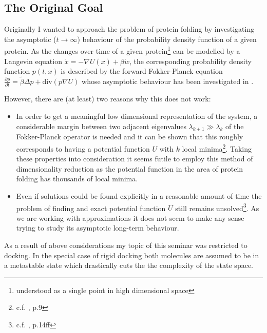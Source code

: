 \subsection{The Original Goal}
Originally I wanted to approach the problem of protein folding by investigating the asymptotic ($t\rightarrow\infty$) behaviour of the probability density function of a given protein. As the changes over time of a given protein\footnote{understood as a single point in high dimensional space} can be modelled by a Langevin equation $\dot x = -\nabla U(x)+\beta\dot w$, the corresponding probability density function $p(t,x)$ is described by the forward Fokker-Planck equation $\frac{\partial p}{\partial t} = \tilde\beta \Delta p + \text{div}(p\nabla U)$ whose asymptotic behaviour has been investigated in \cite{Nadler2008}.

However, there are (at least) two reasons why this does not work:
\begin{itemize}
	\item In order to get a meaningful low dimensional representation of the system, a considerable margin between two adjacent eigenvalues $\lambda_{k+1} \gg \lambda_k$ of the Fokker-Planck operator is needed and it can be shown that this roughly corresponds to having a potential function $U$ with $k$ local minima\footnote{c.f. \cite[pp.9]{Nadler2008}, p.9}. Taking these properties into consideration it seems futile to employ this method of dimensionality reduction as the potential function in the area of protein folding has thousands of local minima.
	\item Even if solutions could be found explicitly in a reasonable amount of time the problem of finding and exact potential function $U$ still remains unsolved\footnote{c.f. \cite{Neumaier97}, p.14ff}. As we are working with approximations it does not seem to make any sense trying to study its asymptotic long-term behaviour.
\end{itemize}

As a result of above considerations my topic of this seminar was restricted to docking. In the special case of rigid docking both molecules are assumed to be in a metastable state which drastically cuts the the complexity of the state space.  